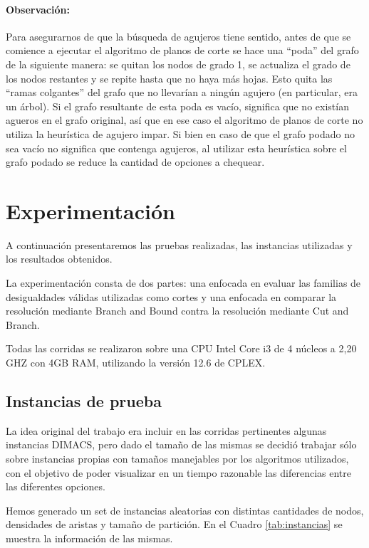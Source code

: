 \documentclass[a4paper]{article}
\begin{document}
\paragraph*{Observación: } Para asegurarnos de que la búsqueda de agujeros tiene sentido, antes de que se comience a ejecutar el algoritmo de planos de corte se hace una ``poda'' del grafo de la siguiente manera: se quitan los nodos de grado 1, se actualiza el grado de los nodos restantes y se repite hasta que no haya más hojas.  Esto quita las ``ramas colgantes'' del grafo que no llevarían a ningún agujero (en particular, era un árbol). Si el grafo resultante de esta poda es vacío, significa que no existían agueros en el grafo original, así que en ese caso el algoritmo de planos de corte no utiliza la heurística de agujero impar. Si bien en caso de que el grafo podado no sea vacío no significa que contenga agujeros, al utilizar esta heurística sobre el grafo podado se reduce la cantidad de opciones a chequear.

\newpage

\section{Experimentación}

A continuación presentaremos las pruebas realizadas, las instancias utilizadas y los resultados obtenidos.

La experimentación consta de dos partes: una enfocada en evaluar las familias de desigualdades válidas utilizadas como cortes y una enfocada en comparar la resolución mediante Branch and Bound contra la resolución mediante Cut and Branch.

Todas las corridas se realizaron sobre una CPU Intel Core i3 de 4 núcleos a 2,20 GHZ con 4GB RAM, utilizando la versión 12.6 de CPLEX.

\subsection{Instancias de prueba}

La idea original del trabajo era incluir en las corridas pertinentes algunas instancias DIMACS, pero dado el tamaño de las mismas se decidió trabajar sólo sobre instancias propias con tamaños manejables por los algoritmos utilizados, con el objetivo de poder visualizar en un tiempo razonable las diferencias entre las diferentes opciones.

Hemos generado un set de instancias aleatorias con distintas cantidades de nodos, densidades de aristas y tamaño de partición. En el Cuadro \ref{tab:instancias} se muestra la información de las mismas.
\end{document}
